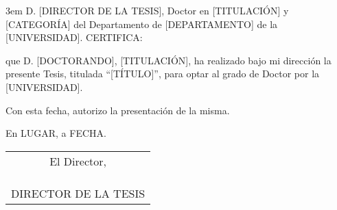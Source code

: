 \cleardoublepage
\thispagestyle{empty}
\hfill\begin{minipage}[t]{0.85\textwidth}\parindent 3em
D. [DIRECTOR DE LA TESIS], Doctor en [TITULACIÓN] y [CATEGORÍA] del
Departamento de [DEPARTAMENTO] de la [UNIVERSIDAD].
\null\vspace{\baselineskip}
CERTIFICA:

\vspace{\baselineskip}
que D. [DOCTORANDO], [TITULACIÓN], ha realizado bajo mi
dirección la presente Tesis, titulada ``[TÍTULO]'', para optar al
grado de Doctor por la [UNIVERSIDAD].

\vspace{\baselineskip}
Con esta fecha, autorizo la presentación de la misma.

\vspace{\baselineskip}
\hfill En LUGAR, a FECHA.

\vspace{\baselineskip}
\hfill\begin{tabular}{c}
El Director, \\\\\\\\
DIRECTOR DE LA TESIS
\end{tabular}
\end{minipage}
